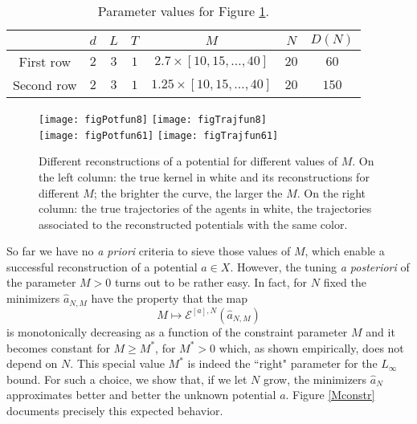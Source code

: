 \begin{table}[h]
\begin{center}
\begin{tabular}{ |c|c|c|c|c|c|c| }
\hline
 & $d$ & $L$ & $T$ & $M$ & $N$ & $D(N)$ \\
\hline
\hline
 First row & $2$ & $3$ & $1$ & $2.7 \times [10,15,\ldots,40]$ & $20$ & $60$ \\
\hline
 Second row & $2$ & $3$ & $1$ & $1.25 \times [10,15,\ldots,40]$ & $20$ & $150$ \\
\hline
\end{tabular}
\end{center}
\vspace{-0.5cm}
\caption{Parameter values for Figure \ref{Mconstr1}.} \label{tab:figM} 
\end{table}

\begin{figure}[h!]
\begin{center}
\hspace{-0.7cm}\texttt{[image: figPotfun8]}\hspace{-0.9cm}
\texttt{[image: figTrajfun8]}\\
\hspace{-0.7cm}\texttt{[image: figPotfun61]}\hspace{-0.9cm}
\texttt{[image: figTrajfun61]}
\end{center}
\caption{Different reconstructions of a potential for different values of $M$. On the left column: the true kernel in white and its reconstructions for different $M$; the brighter the curve, the larger the $M$. On the right column: the true trajectories of the agents in white, the trajectories associated to the reconstructed potentials with the same color.}\label{Mconstr1}
\end{figure}

So far we have no  {\it a priori} criteria to sieve those values of $M$, which enable a successful reconstruction of a potential $a \in X$. However,  the tuning {\it a posteriori} of the parameter $M>0$ turns out to be rather easy. In fact, for $N$ fixed the minimizers $\widehat a_{N,M}$ have the property that the map
$$
 M \mapsto   \mathcal E^{[a],N}(\widehat a_{N,M})
$$
is monotonically decreasing as a function of the constraint parameter $M$ and it becomes constant for $M\geq M^*$, for $M^*>0$ which, as shown empirically, does not depend on $N$. This special value $M^*$ is indeed the ``right" parameter for the $L_\infty$ bound. For such a choice, we show that, if we let $N$ grow, the minimizers $\widehat{a}_N$ approximates better and better the unknown potential $a$. 
Figure \ref{Mconstr} documents precisely this expected behavior.

